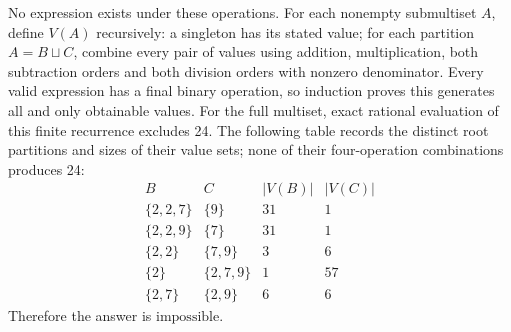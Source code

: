 No expression exists under these operations. For each nonempty submultiset $A$, define $V(A)$ recursively: a singleton has its stated value; for each partition $A=B\sqcup C$, combine every pair of values using addition, multiplication, both subtraction orders and both division orders with nonzero denominator. Every valid expression has a final binary operation, so induction proves this generates all and only obtainable values. For the full multiset, exact rational evaluation of this finite recurrence excludes 24. The following table records the distinct root partitions and sizes of their value sets; none of their four-operation combinations produces 24: \[\begin{array}{c|c|r|r}B&C&|V(B)|&|V(C)|\\\hline\{2,2,7\}&\{9\}&31&1\\\{2,2,9\}&\{7\}&31&1\\\{2,2\}&\{7,9\}&3&6\\\{2\}&\{2,7,9\}&1&57\\\{2,7\}&\{2,9\}&6&6\end{array}\] Therefore the answer is $\boxed{\text{impossible}}$.
